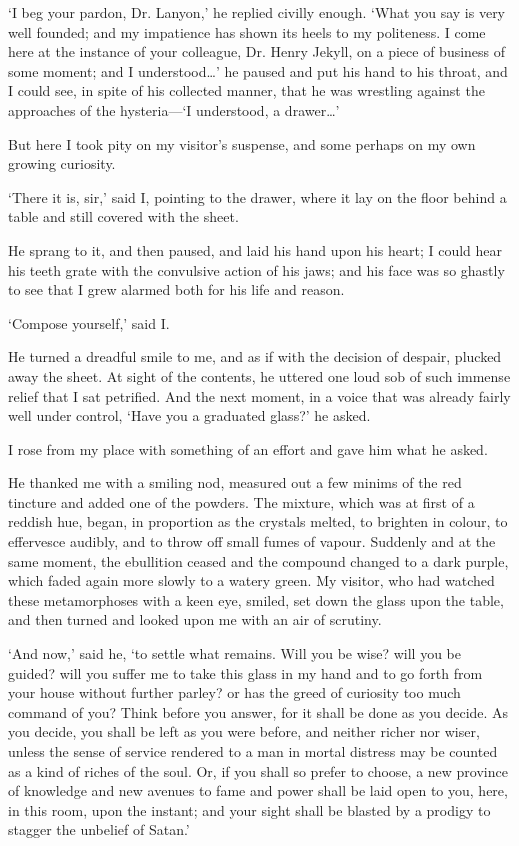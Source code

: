 \documentclass[]{novel}
\begin{document}
‘I beg your pardon, Dr. Lanyon,’ he replied civilly enough. ‘What you say is very well founded; and my impatience has shown its heels to my politeness. I come here at the instance of your colleague, Dr. Henry Jekyll, on a piece of business of some moment; and I understood…’ he paused and put his hand to his throat, and I could see, in spite of his collected manner, that he was wrestling against the approaches of the hysteria—‘I understood, a drawer…’

But here I took pity on my visitor’s suspense, and some perhaps on my own growing curiosity.

‘There it is, sir,’ said I, pointing to the drawer, where it lay on the floor behind a table and still covered with the sheet.

He sprang to it, and then paused, and laid his hand upon his heart; I could hear his teeth grate with the convulsive action of his jaws; and his face was so ghastly to see that I grew alarmed both for his life and reason.

‘Compose yourself,’ said I.

He turned a dreadful smile to me, and as if with the decision of despair, plucked away the sheet. At sight of the contents, he uttered one loud sob of such immense relief that I sat petrified. And the next moment, in a voice that was already fairly well under control, ‘Have you a graduated glass?’ he asked.

I rose from my place with something of an effort and gave him what he asked.

He thanked me with a smiling nod, measured out a few minims of the red tincture and added one of the powders. The mixture, which was at first of a reddish hue, began, in proportion as the crystals melted, to brighten in colour, to effervesce audibly, and to throw off small fumes of vapour. Suddenly and at the same moment, the ebullition ceased and the compound changed to a dark purple, which faded again more slowly to a watery green. My visitor, who had watched these metamorphoses with a keen eye, smiled, set down the glass upon the table, and then turned and looked upon me with an air of scrutiny.

‘And now,’ said he, ‘to settle what remains. Will you be wise? will you be guided? will you suffer me to take this glass in my hand and to go forth from your house without further parley? or has the greed of curiosity too much command of you? Think before you answer, for it shall be done as you decide. As you decide, you shall be left as you were before, and neither richer nor wiser, unless the sense of service rendered to a man in mortal distress may be counted as a kind of riches of the soul. Or, if you shall so prefer to choose, a new province of knowledge and new avenues to fame and power shall be laid open to you, here, in this room, upon the instant; and your sight shall be blasted by a prodigy to stagger the unbelief of Satan.’
\end{document}
